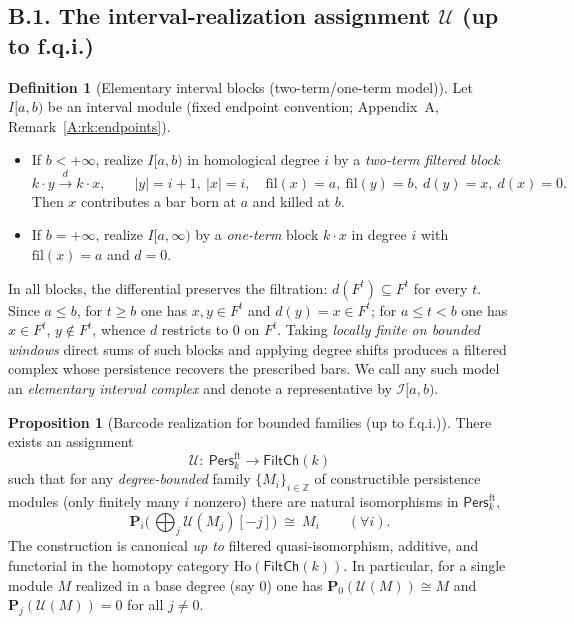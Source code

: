 \documentclass[11pt]{article}
\numberwithin{equation}{section}
\theoremstyle{plain}
\theoremstyle{definition}
\theoremstyle{remark}
\newcommand{\Pers}{\mathsf{Pers}}
\newcommand{\Ho}{\mathrm{Ho}}
\theoremstyle{plain}
\theoremstyle{definition}
\numberwithin{equation}{section}
\newtheorem{proposition}[theorem]{Proposition}
\theoremstyle{definition}
\newtheorem{definition}[theorem]{Definition}
\numberwithin{equation}{section}
\theoremstyle{plain}
\theoremstyle{definition}
\theoremstyle{remark}
\begin{document}
\subsection*{B.1. The interval-realization assignment \texorpdfstring{$\mathcal{U}$}{U} (up to f.q.i.)}
\begin{definition}[Elementary interval blocks (two-term/one-term model)]
Let \(I[a,b)\) be an interval module (fixed endpoint convention; Appendix~A, Remark~\ref{A:rk:endpoints}).
\begin{itemize}
  \item If \(b<+\infty\), realize \(I[a,b)\) in homological degree \(i\) by a \emph{two-term filtered block}
  \[
    k\cdot y \xrightarrow{\,d\,} k\cdot x,\qquad |y|=i+1,\ |x|=i,\quad
       \mathrm{fil}(x)=a,\ \mathrm{fil}(y)=b,\ d(y)=x,\ d(x)=0.
  \]
  Then \(x\) contributes a bar born at \(a\) and killed at \(b\).
  \item If \(b=+\infty\), realize \(I[a,\infty)\) by a \emph{one-term} block \(k\cdot x\) in degree \(i\) with \(\mathrm{fil}(x)=a\) and \(d=0\).
\end{itemize}
In all blocks, the differential preserves the filtration: \(d(F^t)\subseteq F^t\) for every \(t\).
Since \(a\le b\), for \(t\ge b\) one has \(x,y\in F^t\) and \(d(y)=x\in F^t\); for \(a\le t<b\) one has \(x\in F^t\), \(y\notin F^t\), whence \(d\) restricts to \(0\) on \(F^t\).
Taking \emph{locally finite on bounded windows} direct sums of such blocks and applying degree shifts produces a filtered complex whose persistence recovers the prescribed bars.
We call any such model an \emph{elementary interval complex} and denote a representative by \(\mathcal{I}[a,b)\).
\end{definition}

\begin{proposition}[Barcode realization for bounded families (up to f.q.i.)]\label{B:prop:U}
There exists an assignment
\[
\mathcal{U}:\ \Pers^{\mathrm{ft}}_k\longrightarrow \mathsf{FiltCh}(k)
\]
such that for any \emph{degree-bounded} family \(\{M_i\}_{i\in\mathbb{Z}}\) of constructible persistence modules
(only finitely many \(i\) nonzero) there are natural isomorphisms in \(\Pers^{\mathrm{ft}}_k\),
\[
\mathbf{P}_i\!\Big(\,\bigoplus_{j}\mathcal{U}(M_j)[-j]\Big)\ \cong\ M_i\qquad(\forall i).
\]
The construction is canonical \emph{up to} filtered quasi-isomorphism, additive, and functorial in the homotopy category \(\Ho(\mathsf{FiltCh}(k))\).
In particular, for a single module \(M\) realized in a base degree (say \(0\)) one has \(\mathbf{P}_0(\mathcal{U}(M))\cong M\) and \(\mathbf{P}_j(\mathcal{U}(M))=0\) for all \(j\neq 0\).
\end{proposition}
\end{document}

